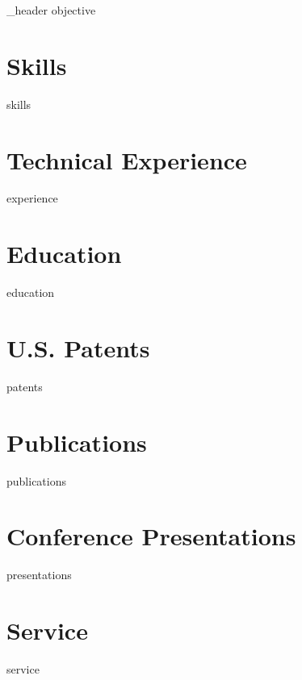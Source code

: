 \documentclass[letter,10pt]{article}
\author{Joelle Tori Maslak} %
\begin{document}
{_header}
{objective}

\raggedright

\section{Skills}
{skills}

\section{Technical Experience}
{experience}

\section{Education}
{education}

\section{U.S. Patents}
{patents}

\section{Publications}
{publications}

\section{Conference Presentations}
{presentations}

\section{Service}
{service}
\end{document}
